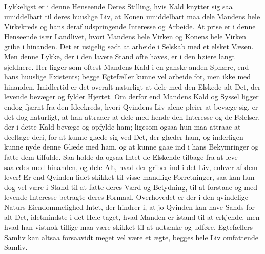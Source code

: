 \documentclass[12pt,a4paper]{book}
\newcommand{\apage}[1]{\marginnote{\footnotesize\textit{[#1]}}}
\begin{document}
Lykkeligst er i denne Henseende Deres Stilling, hvis Kald knytter sig
saa umiddelbart til deres huuslige Liv, at Konen umiddelbart maa dele
Mandens hele Virkekreds og hans deraf udspringende Interesse og Arbeide.
At prise er i denne Henseende især Landlivet, hvori Mandens hele Virken
og Konens hele Virken gribe i hinanden. Det er usigelig sødt at arbeide
i Selskab med et elsket Væsen. Men denne Lykke, der i den lavere Stand
ofte haves, er i den høiere langt sjeldnere. Her ligger som oftest
Mandens Kald i en ganske anden Sphære, end hans huuslige Existents;
begge Egtefæller kunne vel arbeide for, men ikke med hinanden.
Imidlertid er det overalt naturligt at dele med den Elskede alt Det, der
levende bevæger og fylder Hjertet. Om derfor end Mandens Kald og Syssel
ligger endog fjærnt fra den Ideekreds, hvori Qvindens Liv alene pleier
at bevæge sig, er det dog naturligt, at han attraaer at dele med hende
den Interesse og de Følelser, der i dette Kald bevæge og opfylde ham;
ligesom ogsaa hun maa attraae at deeltage deri, for at kunne glæde sig
ved Det, der glæder ham, og inderligen kunne nyde denne Glæde med ham,
og at kunne gaae ind i hans Bekymringer og fatte dem tilfulde. Saa holde
da ogsaa Intet de Elskende tilbage fra at leve saaledes med hinanden, og
dele Alt, hvad der griber ind i det Liv, enhver af dem lever! Er end \apage{104}
Qvinden lidet skikket til visse mandlige Forretninger, saa kan hun dog
vel være i Stand til at fatte deres Værd og Betydning, til at forstaae
og med levende Interesse betragte deres Formaal. Overhovedet er der i
den qvindelige Naturs Eiendommelighed Intet, der hindrer i, at jo
Qvinden kan have Sands for alt Det, idetmindste i det Hele taget, hvad
Manden er istand til at erkjende, men hvad han vistnok tillige maa være
skikket til at udtænke og udføre. Egtefællers Samliv kan altsaa
forsaavidt meget vel være et ægte, begges hele Liv omfattende Samliv.
\end{document}
